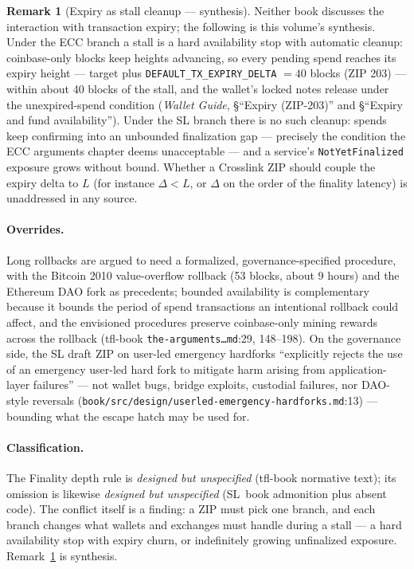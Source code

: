 \documentclass[11pt,a4paper]{article}
\theoremstyle{definition}
\newtheorem{remark}[theorem]{Remark}
\begin{document}
\begin{remark}[Expiry as stall cleanup --- synthesis]
\label{rem:xl-stall-expiry}
Neither book discusses the interaction with transaction expiry; the
following is this volume's synthesis. Under the ECC branch a stall is a
hard availability stop with automatic cleanup: coinbase-only blocks keep
heights advancing, so every pending spend reaches its expiry height ---
target plus \texttt{DEFAULT\_TX\_EXPIRY\_DELTA} $= 40$ blocks (ZIP 203)
--- within about 40 blocks of the stall, and the wallet's locked notes
release under the unexpired-spend condition (\emph{Wallet Guide},
\S``Expiry (ZIP-203)'' and \S``Expiry and fund availability''). Under the
SL branch there is no such cleanup: spends keep confirming into an
unbounded finalization gap --- precisely the condition the ECC arguments
chapter deems unacceptable --- and a service's
\texttt{NotYetFinalized} exposure grows without bound. Whether a
Crosslink ZIP should couple the expiry delta to $L$ (for instance
$\Delta < L$, or $\Delta$ on the order of the finality latency) is
unaddressed in any source.
\end{remark}

\paragraph{Overrides.} Long rollbacks are argued to need a formalized,
governance-specified procedure, with the Bitcoin 2010 value-overflow
rollback (53 blocks, about 9 hours) and the Ethereum DAO fork as
precedents; bounded availability is complementary because it bounds the
period of spend transactions an intentional rollback could affect, and
the envisioned procedures preserve coinbase-only mining rewards across
the rollback (tfl-book \texttt{the-arguments\ldots{}md}:29, 148--198).
On the governance side, the SL draft ZIP on user-led emergency hardforks
``explicitly rejects the use of an emergency user-led hard fork to
mitigate harm arising from application-layer failures'' --- not wallet
bugs, bridge exploits, custodial failures, nor DAO-style reversals
(\texttt{book/src/design/userled-emergency-hardforks.md}:13) --- bounding
what the escape hatch may be used for.

\paragraph{Classification.} The Finality depth rule is \emph{designed but
unspecified} (tfl-book normative text); its omission is likewise
\emph{designed but unspecified} (SL~book admonition plus absent code).
The conflict itself is a finding: a ZIP must pick one branch, and each
branch changes what wallets and exchanges must handle during a stall ---
a hard availability stop with expiry churn, or indefinitely growing
unfinalized exposure. Remark~\ref{rem:xl-stall-expiry} is synthesis.
\end{document}

